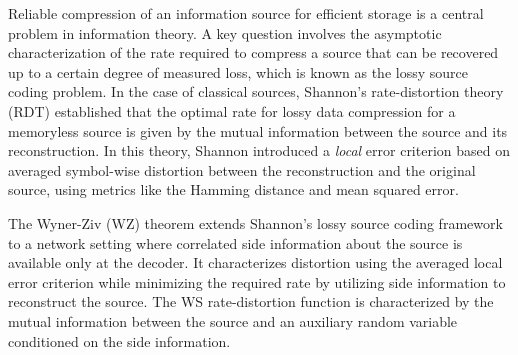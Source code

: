 

Reliable compression of an information source for efficient storage is a central problem in information theory. A key question involves the asymptotic characterization of the rate required to compress a source that can be recovered up to a certain degree of measured loss, which is known as the lossy source coding problem. In the case of classical sources, Shannon’s rate-distortion theory (RDT) \cite{shannon1959coding} established that the optimal rate for lossy data compression for a memoryless source is given by the mutual information between the source and its reconstruction. In this theory, Shannon introduced a \textit{local} error criterion based on averaged symbol-wise distortion between the reconstruction and the original source, using metrics like the Hamming distance and mean squared error.


The Wyner-Ziv (WZ) \cite{wyner1976rate} theorem extends Shannon's lossy source coding framework to a network setting where correlated side information about the source is available only at the decoder. 
It characterizes distortion using the averaged local error criterion while minimizing the required rate by utilizing side information to reconstruct the source.  
The WS rate-distortion function is characterized by the mutual information between the source and an auxiliary random variable conditioned on the side information. 

